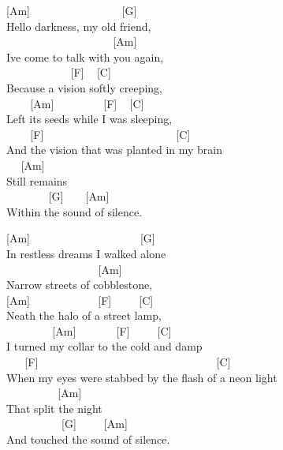 \documentclass[
  letterpaper,
]{scrbook}
\begin{document}
{[}Am{]} ~ ~ ~ ~ ~ ~ ~ ~ ~ ~{[}G{]}\\
Hello darkness, my old friend,\\
\hspace*{0.333em} ~ ~ ~ ~ ~ ~ ~ ~ ~ ~ ~ ~{[}Am{]}\\
I\textquotesingle ve come to talk with you again,\\
\hspace*{0.333em} ~ ~ ~ ~ ~ ~ ~ {[}F{]} ~ {[}C{]} ~ ~ ~ ~\\
Because a vision softly creeping,\\
\hspace*{0.333em} ~ ~ ~{[}Am{]} ~ ~ ~ ~ ~ {[}F{]} ~ {[}C{]} ~ ~ ~ ~ ~ ~
~ ~\\
Left its seeds while I was sleeping,\\
\hspace*{0.333em} ~ ~ ~{[}F{]} ~ ~ ~ ~ ~ ~ ~ ~ ~ ~ ~ ~ ~ ~ {[}C{]} ~\\
And the vision that was planted in my brain\\
\hspace*{0.333em} ~ ~{[}Am{]} ~ ~ ~\\
Still remains\\
\hspace*{0.333em} ~ ~ ~ ~ ~{[}G{]} ~ ~ {[}Am{]} ~ ~ ~ ~ ~ ~ ~\\
Within the sound of silence.

{[}Am{]} ~ ~ ~ ~ ~ ~ ~ ~ ~ ~ ~ ~{[}G{]} ~ ~ ~ ~\\
In restless dreams I walked alone\\
\hspace*{0.333em} ~ ~ ~ ~ ~ ~ ~ ~ ~ ~ {[}Am{]}\\
Narrow streets of cobblestone,\\
{[}Am{]} ~ ~ ~ ~ ~ ~ ~ {[}F{]} ~ ~ ~{[}C{]}\\
\textquotesingle Neath the halo of a street lamp,\\
\hspace*{0.333em} ~ ~ ~ ~ ~ {[}Am{]} ~ ~ ~ ~ {[}F{]} ~ ~ ~{[}C{]}\\
I turned my collar to the cold and damp\\
\hspace*{0.333em} ~ ~ {[}F{]} ~ ~ ~ ~ ~ ~ ~ ~ ~ ~ ~ ~ ~ ~ ~ ~ ~ ~ ~
{[}C{]} ~ ~\\
When my eyes were stabbed by the flash of a neon light\\
\hspace*{0.333em} ~ ~ ~ ~ ~ ~{[}Am{]}\\
That split the night\\
\hspace*{0.333em} ~ ~ ~ ~ ~ ~ {[}G{]} ~ ~ ~{[}Am{]}\\
And touched the sound of silence.
\end{document}
